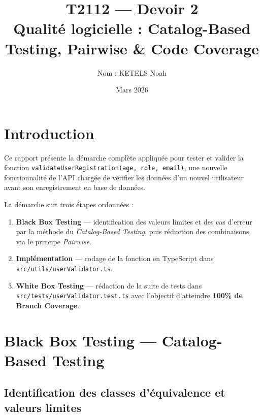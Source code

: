 \documentclass[11pt,a4paper]{article}
\title{T2112 --- Devoir 2 \\[0.4em]\large Qualité logicielle : Catalog-Based Testing, Pairwise \& Code Coverage}
\author{Nom : KETELS Noah}
\date{Mars 2026}
\begin{document}
\maketitle
\tableofcontents
\bigskip

\section{Introduction}

Ce rapport présente la démarche complète appliquée pour tester et valider la fonction
\texttt{validateUserRegistration(age, role, email)}, une nouvelle fonctionnalité de l'API
chargée de vérifier les données d'un nouvel utilisateur avant son enregistrement en base de données.

La démarche suit trois étapes ordonnées :
\begin{enumerate}
  \item \textbf{Black Box Testing} --- identification des valeurs limites et des cas d'erreur
        par la méthode du \emph{Catalog-Based Testing}, puis réduction des combinaisons via le
        principe \emph{Pairwise}.
  \item \textbf{Implémentation} --- codage de la fonction en TypeScript dans
        \texttt{src/utils/userValidator.ts}.
  \item \textbf{White Box Testing} --- rédaction de la suite de tests dans
        \texttt{src/tests/userValidator.test.ts} avec l'objectif d'atteindre
        \textbf{100\% de Branch Coverage}.
\end{enumerate}

\section{Black Box Testing --- Catalog-Based Testing}

\subsection{Identification des classes d'équivalence et valeurs limites}
\end{document}
